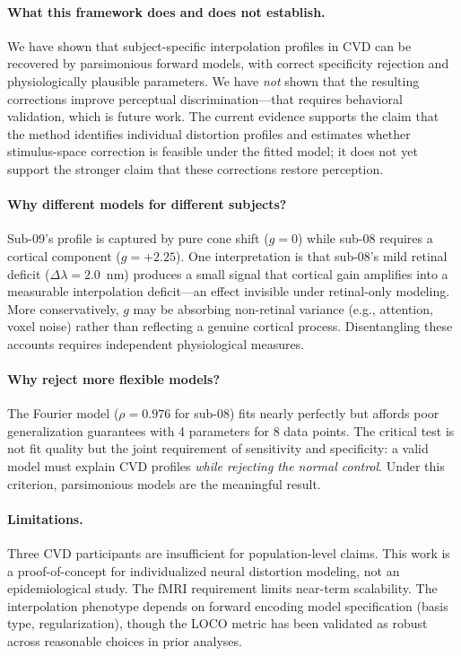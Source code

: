 \documentclass{article}
\begin{document}
\paragraph{What this framework does and does not establish.}
We have shown that subject-specific interpolation profiles in CVD can be recovered by parsimonious forward models, with correct specificity rejection and physiologically plausible parameters.
We have \emph{not} shown that the resulting corrections improve perceptual discrimination---that requires behavioral validation, which is future work.
The current evidence supports the claim that the method identifies individual distortion profiles and estimates whether stimulus-space correction is feasible under the fitted model; it does not yet support the stronger claim that these corrections restore perception.

\paragraph{Why different models for different subjects?}
Sub-09's profile is captured by pure cone shift ($g = 0$) while sub-08 requires a cortical component ($g = +2.25$).
One interpretation is that sub-08's mild retinal deficit ($\Delta\lambda = 2.0$~nm) produces a small signal that cortical gain amplifies into a measurable interpolation deficit---an effect invisible under retinal-only modeling.
More conservatively, $g$ may be absorbing non-retinal variance (e.g., attention, voxel noise) rather than reflecting a genuine cortical process.
Disentangling these accounts requires independent physiological measures.

\paragraph{Why reject more flexible models?}
The Fourier model ($\rho = 0.976$ for sub-08) fits nearly perfectly but affords poor generalization guarantees with 4 parameters for 8 data points.
The critical test is not fit quality but the joint requirement of sensitivity and specificity: a valid model must explain CVD profiles \emph{while rejecting the normal control}.
Under this criterion, parsimonious models are the meaningful result.

\paragraph{Limitations.}
Three CVD participants are insufficient for population-level claims.
This work is a proof-of-concept for individualized neural distortion modeling, not an epidemiological study.
The fMRI requirement limits near-term scalability.
The interpolation phenotype depends on forward encoding model specification (basis type, regularization), though the LOCO metric has been validated as robust across reasonable choices in prior analyses.
\end{document}
